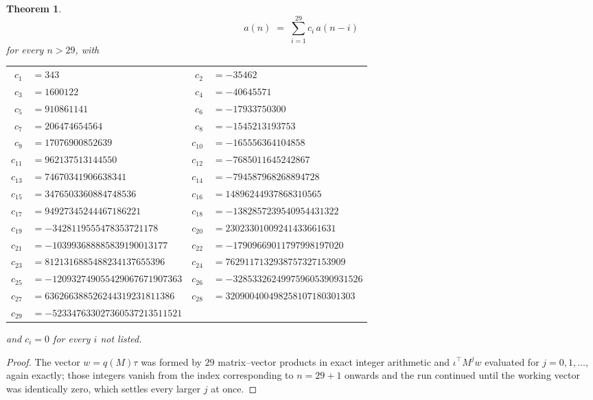 \documentclass[11pt,a4paper]{article}
\theoremstyle{plain}
\newtheorem{theorem}{Theorem}
\theoremstyle{definition}
\begin{document}
\begin{theorem}
\[
a(n)\;=\;\sum_{i=1}^{29}c_i\,a(n-i)
\]
for every $n>29$, with
\begin{center}\footnotesize
\begin{tabular}{r@{\,}l@{\qquad}r@{\,}l}
$c_{1}$ & $=343$ & $c_{2}$ & $=-35462$ \\
$c_{3}$ & $=1600122$ & $c_{4}$ & $=-40645571$ \\
$c_{5}$ & $=910861141$ & $c_{6}$ & $=-17933750300$ \\
$c_{7}$ & $=206474654564$ & $c_{8}$ & $=-1545213193753$ \\
$c_{9}$ & $=17076900852639$ & $c_{10}$ & $=-165556364104858$ \\
$c_{11}$ & $=962137513144550$ & $c_{12}$ & $=-7685011645242867$ \\
$c_{13}$ & $=74670341906638341$ & $c_{14}$ & $=-794587968268894728$ \\
$c_{15}$ & $=3476503360884748536$ & $c_{16}$ & $=14896244937868310565$ \\
$c_{17}$ & $=94927345244467186221$ & $c_{18}$ & $=-1382857239540954431322$ \\
$c_{19}$ & $=-3428119555478353721178$ & $c_{20}$ & $=23023301009241433661631$ \\
$c_{21}$ & $=-103993688885839190013177$ & $c_{22}$ & $=-17909669011797998197020$ \\
$c_{23}$ & $=8121316885488234137655396$ & $c_{24}$ & $=7629117132938757327153909$ \\
$c_{25}$ & $=-120932749055429067671907363$ & $c_{26}$ & $=-328533262499759605390931526$ \\
$c_{27}$ & $=636266388526244319231811386$ & $c_{28}$ & $=320900400498258107180301303$ \\
$c_{29}$ & $=-523347633027360537213511521$ \\
\end{tabular}
\end{center}
and $c_i=0$ for every $i$ not listed.
\end{theorem}

\begin{proof}
The vector $w=q(M)\tau$ was formed by $29$ matrix--vector products in exact integer
arithmetic and $\iota^{\!\top}M^{j}w$ evaluated for $j=0,1,\dots$, again exactly; those
integers vanish from the index corresponding to $n=29+1$ onwards and the run continued
until the working vector was identically zero, which settles every larger $j$ at once.
\end{proof}
\end{document}
